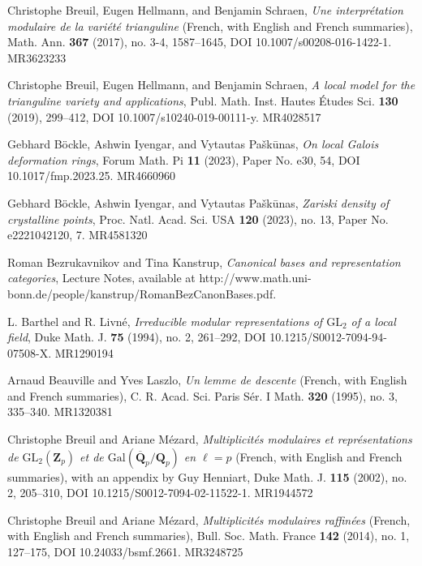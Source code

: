 \item[{[BHS17b]}] Christophe Breuil, Eugen Hellmann, and Benjamin Schraen, \emph{Une interpr\'etation modulaire de la vari\'et\'e trianguline} (French, with English and French summaries), Math. Ann. \textbf{367} (2017), no. 3-4, 1587--1645, DOI 10.1007/s00208-016-1422-1. MR3623233
\item[{[BHS19]}] Christophe Breuil, Eugen Hellmann, and Benjamin Schraen, \emph{A local model for the trianguline variety and applications}, Publ. Math. Inst. Hautes \'Etudes Sci. \textbf{130} (2019), 299--412, DOI 10.1007/s10240-019-00111-y. MR4028517
\item[{[BIP23a]}] Gebhard B\"ockle, Ashwin Iyengar, and Vytautas Pa\v{s}k\={u}nas, \emph{On local Galois deformation rings}, Forum Math. Pi \textbf{11} (2023), Paper No. e30, 54, DOI 10.1017/fmp.2023.25. MR4660960
\item[{[BIP23b]}] Gebhard B\"ockle, Ashwin Iyengar, and Vytautas Pa\v{s}k\={u}nas, \emph{Zariski density of crystalline points}, Proc. Natl. Acad. Sci. USA \textbf{120} (2023), no. 13, Paper No. e2221042120, 7. MR4581320
\item[{[BK]}] Roman Bezrukavnikov and Tina Kanstrup, \emph{Canonical bases and representation categories}, Lecture Notes, available at http://www.math.uni-bonn.de/people/kanstrup/RomanBezCanonBases.pdf.
\item[{[BL94]}] L. Barthel and R. Livn\'e, \emph{Irreducible modular representations of $\mathrm{GL}_2$ of a local field}, Duke Math. J. \textbf{75} (1994), no. 2, 261--292, DOI 10.1215/S0012-7094-94-07508-X. MR1290194
\item[{[BL95]}] Arnaud Beauville and Yves Laszlo, \emph{Un lemme de descente} (French, with English and French summaries), C. R. Acad. Sci. Paris S\'er. I Math. \textbf{320} (1995), no. 3, 335--340. MR1320381
\item[{[BM02]}] Christophe Breuil and Ariane M\'ezard, \emph{Multiplicit\'es modulaires et repr\'esentations de $\mathrm{GL}_2(\mathbf{Z}_p)$ et de $\mathrm{Gal}(\overline{\mathbf{Q}}_p/\mathbf{Q}_p)$ en $\ell=p$} (French, with English and French summaries), with an appendix by Guy Henniart, Duke Math. J. \textbf{115} (2002), no. 2, 205--310, DOI 10.1215/S0012-7094-02-11522-1. MR1944572
\item[{[BM14]}] Christophe Breuil and Ariane M\'ezard, \emph{Multiplicit\'es modulaires raffin\'ees} (French, with English and French summaries), Bull. Soc. Math. France \textbf{142} (2014), no. 1, 127--175, DOI 10.24033/bsmf.2661. MR3248725

